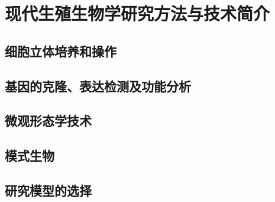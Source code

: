 \chapter{现代生殖生物学研究方法与技术简介}

\section{细胞立体培养和操作}

\section{基因的克隆、表达检测及功能分析}

\section{微观形态学技术}

\section{模式生物}

\section{研究模型的选择}